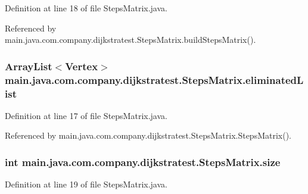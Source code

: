 Definition at line 18 of file Steps\-Matrix.\-java.



Referenced by main.\-java.\-com.\-company.\-dijkstratest.\-Steps\-Matrix.\-build\-Steps\-Matrix().

\hypertarget{classmain_1_1java_1_1com_1_1company_1_1dijkstratest_1_1_steps_matrix_af820b561be0222cbf21fd2a6134047b2}{
\subsubsection[{eliminated\-List}]{\setlength{\rightskip}{0pt plus 5cm}Array\-List$<${\bf Vertex}$>$ main.\-java.\-com.\-company.\-dijkstratest.\-Steps\-Matrix.\-eliminated\-List\hspace{0.3cm}{\ttfamily [private]}}}\label{classmain_1_1java_1_1com_1_1company_1_1dijkstratest_1_1_steps_matrix_af820b561be0222cbf21fd2a6134047b2}


Definition at line 17 of file Steps\-Matrix.\-java.



Referenced by main.\-java.\-com.\-company.\-dijkstratest.\-Steps\-Matrix.\-Steps\-Matrix().

\hypertarget{classmain_1_1java_1_1com_1_1company_1_1dijkstratest_1_1_steps_matrix_a9f574c424ce414987499434ed7311858}{
\subsubsection[{size}]{\setlength{\rightskip}{0pt plus 5cm}int main.\-java.\-com.\-company.\-dijkstratest.\-Steps\-Matrix.\-size\hspace{0.3cm}{\ttfamily [private]}}}\label{classmain_1_1java_1_1com_1_1company_1_1dijkstratest_1_1_steps_matrix_a9f574c424ce414987499434ed7311858}


Definition at line 19 of file Steps\-Matrix.\-java.



